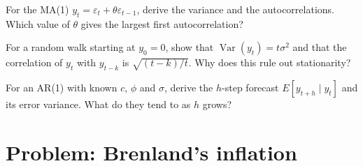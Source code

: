 \begin{exercise}[$\star\star\star$]\label{exo:b2:time-series:10}
For the MA(1) $y_t = \varepsilon_t + \theta\varepsilon_{t-1}$, derive the variance and the autocorrelations. Which
value of $\theta$ gives the largest first autocorrelation?
\end{exercise}

\begin{exercise}[$\star\star\star$]\label{exo:b2:time-series:11}
For a random walk starting at $y_0 = 0$, show that $\operatorname{Var}(y_t) = t\sigma^2$ and that the correlation of $y_t$
with $y_{t-k}$ is $\sqrt{(t - k)/t}$. Why does this rule out stationarity?
\end{exercise}

\begin{exercise}[$\star\star\star$]\label{exo:b2:time-series:12}
For an AR(1) with known $c$, $\phi$ and $\sigma$, derive the $h$-step forecast $E[y_{t+h} \mid y_t]$ and its error variance.
What do they tend to as $h$ grows?
\end{exercise}

\section{Problem: Brenland's inflation}\label{sec:b2:time-series:problem}

